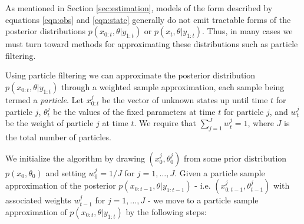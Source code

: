 \documentclass{article}
\begin{document}
%

As mentioned in Section \ref{sec:estimation}, models of the form described by equations \eqref{eqn:obs} and \eqref{eqn:state} generally do not emit tractable forms of the posterior distributions $p(x_{0:t},\theta|y_{1:t})$ or $p(x_t,\theta|y_{1:t})$. Thus, in many cases we must turn toward methods for approximating these distributions such as particle filtering.

Using particle filtering we can approximate the posterior distribution $p(x_{0:t},\theta|y_{1:t})$ through a weighted sample approximation, each sample being termed a \emph{particle}. Let $x^j_{0:t}$ be the vector of unknown states up until time $t$ for particle $j$, $\theta^j_t$ be the values of the fixed parameters at time $t$ for particle $j$, and $w^j_t$ be the weight of particle $j$ at time $t$. We require that $\sum_{j=1}^J w^j_t = 1$, where $J$ is the total number of particles.

We initialize the algorithm by drawing $(x^j_0, \theta^j_0)$ from some prior distribution $p(x_0,\theta_0)$ and setting $w^j_0 = 1 / J$ for $j = 1,\ldots,J$. Given a particle sample approximation of the posterior $p(x_{0:t-1},\theta|y_{1:t-1})$ - i.e. $(x^j_{0:t-1},\theta^j_{t-1})$ with associated weights $w^j_{t-1}$ for $j=1,\ldots,J$ - we move to a particle sample approximation of $p(x_{0:t},\theta|y_{1:t})$ by the following steps:
\end{document}
